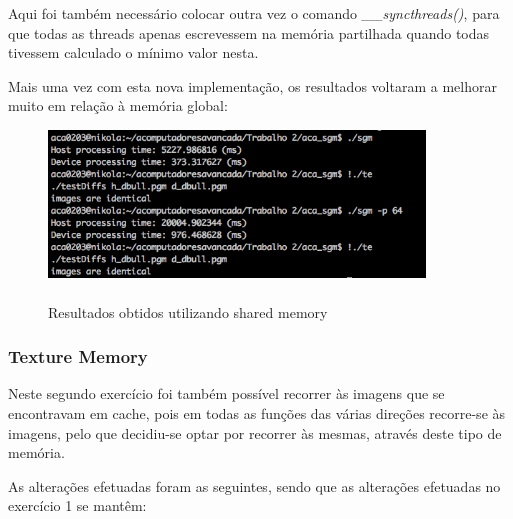 \documentclass[pdftex,12pt,a4paper]{report}
\begin{document}
Aqui foi também necessário colocar outra vez o comando \textit{\_\_syncthreads()}, para que todas as threads apenas escrevessem na memória partilhada quando todas tivessem calculado o mínimo valor nesta.

Mais uma vez com esta nova implementação, os resultados voltaram a melhorar muito em relação à memória global:

\begin{figure}[!htb]
\center
 \includegraphics[width=100mm,scale=1]{IteratePositionShared.png}
 \caption{\\ Resultados obtidos utilizando shared memory}
 \label{fig:IteratePositionShared}
\end{figure}

\newpage
\subsubsection{Texture Memory}

Neste segundo exercício foi também possível recorrer às imagens que se encontravam em cache, pois em todas as funções das várias direções recorre-se às imagens, pelo que decidiu-se optar por recorrer às mesmas, através deste tipo de memória.

As alterações efetuadas foram as seguintes, sendo que as alterações efetuadas no exercício 1 se mantêm:
\end{document}
